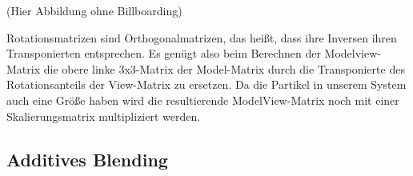 (Hier Abbildung ohne Billboarding)

Rotationsmatrizen sind Orthogonalmatrizen, das heißt, dass ihre Inversen ihren Transponierten entsprechen. Es genügt also beim Berechnen der Modelview-Matrix die obere linke 3x3-Matrix der Model-Matrix durch die Transponierte des Rotationsanteils der View-Matrix zu ersetzen. Da die Partikel in unserem System auch eine Größe haben wird die
resultierende ModelView-Matrix noch mit einer Skalierungsmatrix multipliziert werden.

\subsection{Additives Blending}
\label{Kapitel_2_-_Unterkapitel_1.4}
%